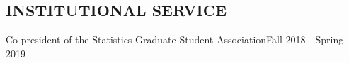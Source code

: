 \documentclass{res}
\begin{document}
\begin{resume}

\section{INSTITUTIONAL SERVICE}
Co-president of the Statistics Graduate Student Association\hfill Fall 2018 - Spring 2019


\end{resume}
\end{document}
